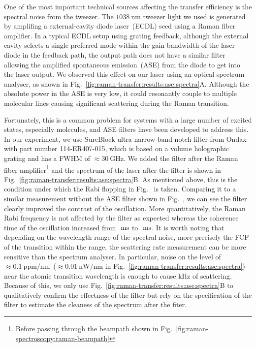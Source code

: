 One of the most important technical sources affecting the transfer efficiency
is the spectral noise from the tweezer.
The $1038~\mathrm{nm}$ tweezer light we used is generated
by amplifing a external-cavity diode laser~(ECDL) seed using a Raman fiber amplifier.
In a typical ECDL setup using grating feedback,
although the external cavity selects a single preferred mode
within the gain bandwidth of the laser diode in the feedback path,
the output path does not have a similar filter
allowing the amplified spontaneous emission~(ASE)
from the diode to get into the laser output.
We observed this effect on our laser using an optical spectrum analyser,
as shown in Fig.~\ref{fig:raman-transfer:results:ase:spectra}A.
Although the absolute power in the ASE is very low,
it could resonantly couple to multiple molecular lines
causing significant scattering during the Raman transition.

Fortunately, this is a common problem for systems with a large number of excited states,
especially molecules, and ASE filters have been developed to address this.
In our experiment, we use SureBlock ultra narrow-band notch filter from Ondax
with part number 114-ER407-015,
which is based on a volume holographic grating and has a FWHM of $\approx\!30~\mathrm{GHz}$.
We added the filter after the Raman fiber amplifier\footnote{
  Before passing through the beampath shown in Fig.~\ref{fig:raman-spectroscopy:raman-beampath}
} and the spectrum of the laser after the filter is shown in
Fig.~\ref{fig:raman-transfer:results:ase:spectra}B.
As mentioned above, this is the condition under which the Rabi flopping
in Fig.~ is taken.
Comparing it to a similar measurement without the ASE filter shown in Fig.~,
we can see the filter clearly improved the contrast of the oscillation. More quantitatively, the Raman Rabi frequency is not affected by the filter as expected
whereas the coherence time of the oscillation increased from $\todo{number}~\mathrm{ms}$
to $\todo{number}~\mathrm{ms}$.
It is worth noting that depending on the wavelength range of the spectral noise,
more precisely the FCF of the transition within the range,
the scattering rate measurement can be more sensitive than the spectrum analyser.
In particular, noise on the level of
$\approx\!0.1~\mathrm{ppm/nm}$~($\approx\!0.01~\mathrm{nW/nm}$
in Fig.~\ref{fig:raman-transfer:results:ase:spectra}) near the atomic transition wavelength
is enough to cause kHz of scattering.
Because of this, we only use Fig.~\ref{fig:raman-transfer:results:ase:spectra}B
to qualitatively confirm the effectness of the filter
but rely on the specification of the filter
to estimate the cleaness of the spectrum after the fiter.

